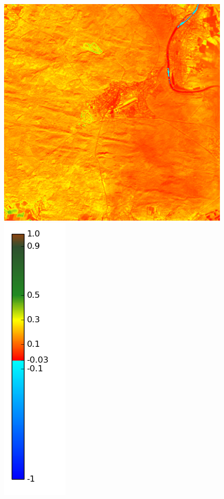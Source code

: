 \documentclass{book}
\begin{document}
\begin{figure}[H]
{\includegraphics[scale=0.2]{images/Fontainebleau/11_ndvi.png}
\includegraphics[scale=0.2]{images/colormap.png}
}
\end{figure}
\end{document}
